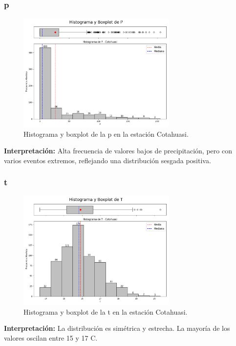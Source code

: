 \subsubsection*{\gls{p} }
\begin{figure}[htbp]
\centering
\includegraphics[width=0.7\textwidth]{resultados/por_estacion_meteorologica/Cotahuasi/P_histograma.png}
\caption{Histograma y boxplot de la \gls{p}  en la estación Cotahuasi.}
\label{fig:cotahuasi_P}
\end{figure}
\textbf{Interpretación:} Alta frecuencia de valores bajos de precipitación, pero con varios eventos extremos, reflejando una distribución sesgada positiva.

\subsubsection*{\gls{t} }
\begin{figure}[htbp]
\centering
\includegraphics[width=0.7\textwidth]{resultados/por_estacion_meteorologica/Cotahuasi/T_histograma.png}
\caption{Histograma y boxplot de la \gls{t}  en la estación Cotahuasi.}
\label{fig:cotahuasi_T}
\end{figure}
\textbf{Interpretación:} La distribución es simétrica y estrecha. La mayoría de los valores oscilan entre 15 y 17 \textdegree C.

